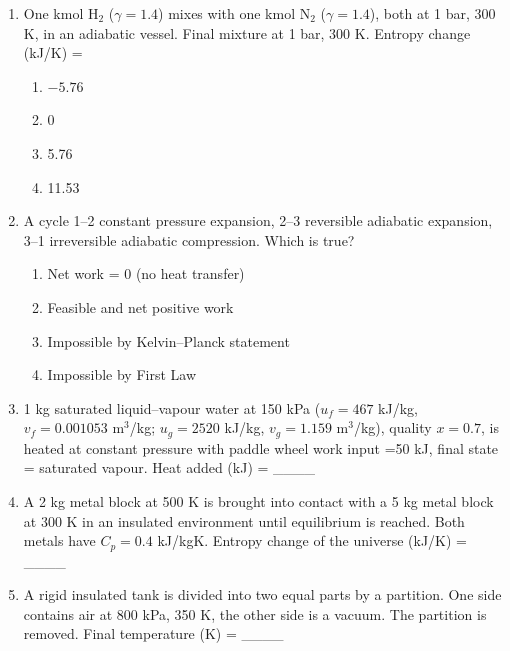 \documentclass[journal,12pt,onecolumn]{IEEEtran}
\begin{document}
\begin{enumerate}[label=\arabic*)]
\item One kmol H$_2$ ($\gamma=1.4$) mixes with one kmol N$_2$ ($\gamma=1.4$), both at 1 bar, 300 K, in an adiabatic vessel. Final mixture at 1 bar, 300 K. Entropy change (kJ/K) =  
\hfill{} \\

\vspace{0.2cm}
\begin{enumerate}[label=\alph*)]
\item $-5.76$
\item 0
\item 5.76
\item 11.53
\end{enumerate}
\vspace{0.5cm}

\item A cycle 1–2 constant pressure expansion, 2–3 reversible adiabatic expansion, 3–1 irreversible adiabatic compression. Which is true?  
\hfill{} \\

\vspace{0.2cm}
\begin{enumerate}[label=\alph*)]
\item Net work = 0 (no heat transfer)
\item Feasible and net positive work
\item Impossible by Kelvin–Planck statement
\item Impossible by First Law
\end{enumerate}
\vspace{0.5cm}

\item 1 kg saturated liquid–vapour water at 150 kPa ($u_f=467$ kJ/kg, $v_f=0.001053$ m$^3$/kg; $u_g=2520$ kJ/kg, $v_g=1.159$ m$^3$/kg), quality $x=0.7$, is heated at constant pressure with paddle wheel work input =50 kJ, final state = saturated vapour. Heat added (kJ) = \_\_\_\_
\hfill{} \\

\vspace{0.5cm}

\item A 2 kg metal block at 500 K is brought into contact with a 5 kg metal block at 300 K in an insulated environment until equilibrium is reached. Both metals have $C_p=0.4$ kJ/kgK. Entropy change of the universe (kJ/K) = \_\_\_\_
\hfill{} \\

\vspace{0.5cm}

\item A rigid insulated tank is divided into two equal parts by a partition. One side contains air at 800 kPa, 350 K, the other side is a vacuum. The partition is removed. Final temperature (K) = \_\_\_\_
\vspace{0.2cm}
\hfill{} \\

\end{enumerate}
\end{document}
